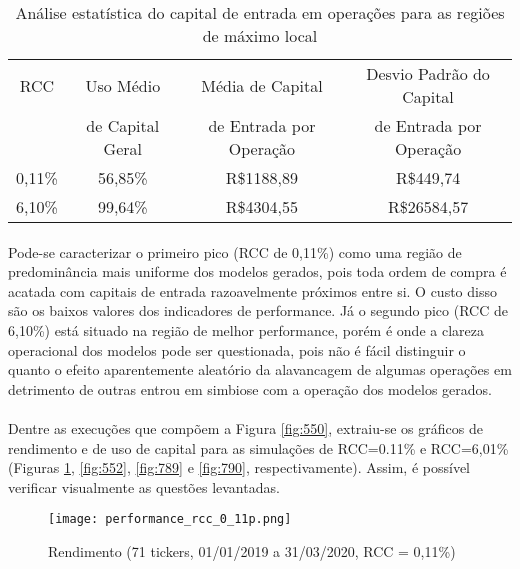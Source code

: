 \begin{table}[h!]
    \begin{center}
        \begin{tabular}{ c|c|cc }
            RCC & Uso Médio         & Média de Capital          & Desvio Padrão do Capital \\
                & de Capital Geral  & de Entrada por Operação   & de Entrada por Operação \\
            \hline
            0,11\% & 56,85\% & R\$1188,89 & R\$449,74 \\
            6,10\% & 99,64\% & R\$4304,55 & R\$26584,57 \\
        \end{tabular}
        \caption{Análise estatística do capital de entrada em operações para as regiões de máximo local}
        \label{tab:465}
    \end{center}
\end{table}

\paragraph{} Pode-se caracterizar o primeiro pico (RCC de 0,11\%) como uma região de predominância mais uniforme dos modelos gerados, pois toda ordem de compra é acatada com capitais de entrada razoavelmente próximos entre si. O custo disso são os baixos valores dos indicadores de performance. Já o segundo pico (RCC de 6,10\%) está situado na região de melhor performance, porém é onde a clareza operacional dos modelos pode ser questionada, pois não é fácil distinguir o quanto o efeito aparentemente aleatório da alavancagem de algumas operações em detrimento de outras entrou em simbiose com a operação dos modelos gerados.

\paragraph{} Dentre as execuções que compõem a Figura \ref{fig:550}, extraiu-se os gráficos de rendimento e de uso de capital para as simulações de RCC=0.11\% e RCC=6,01\% (Figuras \ref{fig:551}, \ref{fig:552}, \ref{fig:789} e \ref{fig:790}, respectivamente). Assim, é possível verificar visualmente as questões levantadas.

\begin{figure}[!htb] %
    \texttt{[image: performance\_rcc\_0\_11p.png]}
    \centering
    \caption{Rendimento (71 tickers, 01/01/2019 a 31/03/2020, RCC = 0,11\%)}
    \label{fig:551}
\end{figure}

